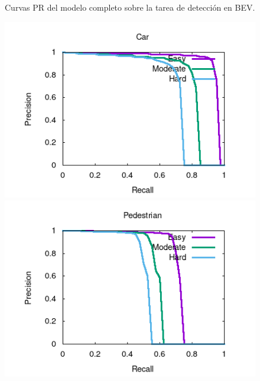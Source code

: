 \begin{figure}[H]
\begin{minipage}{0.333\textwidth}
	\end{minipage}
	\caption{Curvas PR del modelo completo sobre la tarea de detección en BEV.}
	\label{fig:Curvas PR del modelo completo sobre la tarea de detección en BEV.}
\end{figure}

\begin{figure}[H]
	\begin{minipage}{0.333\textwidth}
		\centering
		\includegraphics[width=1\linewidth]{Book/figures/9_completo/car_detection_3d.png}
	\end{minipage}\hfill
	\begin{minipage}{0.333\textwidth}
		\centering
		\includegraphics[width=1\linewidth]{Book/figures/9_completo/pedestrian_detection_3d.png}
	\end{minipage}\hfill
	\begin{minipage}{0.333\textwidth}

\end{minipage}
\end{figure}
